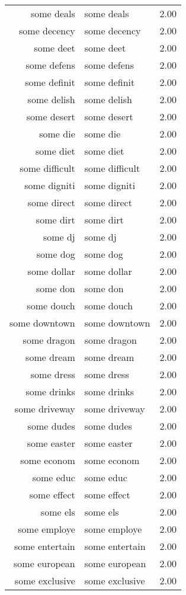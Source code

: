\begin{table}[ht]
\begin{tabular}{rlr}
  some deals & some deals & 2.00 \\ 
  some decency & some decency & 2.00 \\ 
  some deet & some deet & 2.00 \\ 
  some defens & some defens & 2.00 \\ 
  some definit & some definit & 2.00 \\ 
  some delish & some delish & 2.00 \\ 
  some desert & some desert & 2.00 \\ 
  some die & some die & 2.00 \\ 
  some diet & some diet & 2.00 \\ 
  some difficult & some difficult & 2.00 \\ 
  some digniti & some digniti & 2.00 \\ 
  some direct & some direct & 2.00 \\ 
  some dirt & some dirt & 2.00 \\ 
  some dj & some dj & 2.00 \\ 
  some dog & some dog & 2.00 \\ 
  some dollar & some dollar & 2.00 \\ 
  some don & some don & 2.00 \\ 
  some douch & some douch & 2.00 \\ 
  some downtown & some downtown & 2.00 \\ 
  some dragon & some dragon & 2.00 \\ 
  some dream & some dream & 2.00 \\ 
  some dress & some dress & 2.00 \\ 
  some drinks & some drinks & 2.00 \\ 
  some driveway & some driveway & 2.00 \\ 
  some dudes & some dudes & 2.00 \\ 
  some easter & some easter & 2.00 \\ 
  some econom & some econom & 2.00 \\ 
  some educ & some educ & 2.00 \\ 
  some effect & some effect & 2.00 \\ 
  some els & some els & 2.00 \\ 
  some employe & some employe & 2.00 \\ 
  some entertain & some entertain & 2.00 \\ 
  some european & some european & 2.00 \\ 
  some exclusive & some exclusive & 2.00 \\ 

\end{tabular}
\end{table}
